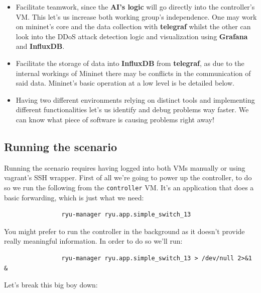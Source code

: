 \documentclass[12pt]{report}
\begin{document}
		\begin{itemize}
			\item Facilitate teamwork, since the \textbf{AI's logic} will go directly into the controller's VM. This let's us increase both working group's independence. One may work on mininet's core and the data collection with \textbf{telegraf} whilst the other can look into the DDoS attack detection logic and visualization using \textbf{Grafana} and \textbf{InfluxDB}.
			\item Facilitate the storage of data into \textbf{InfluxDB} from \textbf{telegraf}, as due to the internal workings of Mininet there may be conflicts in the communication of said data. Mininet's basic operation at a low level is be detailed below.
			\item Having two different environments relying on distinct tools and implementing different functionalities let's us identify and debug problems way faster. We can know what piece of software is causing problems right away!
		\end{itemize}

		\subsection{Running the scenario}
			Running the scenario requires having logged into both VMs manually or using vagrant's SSH wrapper. First of all we're going to power up the controller, to do so we run the following from the \texttt{controller} VM. It's an application that does a basic forwarding, which is just what we need:

			\begin{verbatim}
				ryu-manager ryu.app.simple_switch_13
			\end{verbatim}

			You might prefer to run the controller in the background as it doesn't provide really meaningful information. In order to do so we'll run:

			\begin{verbatim}
				ryu-manager ryu.app.simple_switch_13 > /dev/null 2>&1 &
			\end{verbatim}

			Let's break this big boy down:
\end{document}
